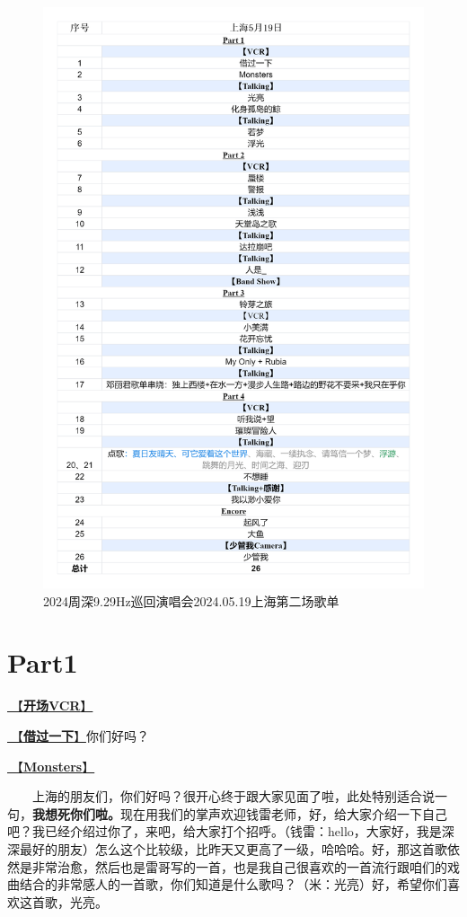 \documentclass[]{ctexbook}
\begin{document}
\begin{figure}

{\centering \includegraphics[width=320pt]{img/playlists/playlists-shanghai-20240519} 

}

\caption{2024周深9.29Hz巡回演唱会2024.05.19上海第二场歌单}\label{fig:unnamed-chunk-36}
\end{figure}

\newpage

\section{Part1}\label{shanghai-20240519-part1}

\hyperref[opening-vcr]{🎥【\textbf{开场VCR}】}

\hyperref[I-will-go-my-way]{🎵【\textbf{借过一下}】}你们好吗？

\hyperref[Monsters]{🎵【\textbf{Monsters}】}

  上海的朋友们，你们好吗？很开心终于跟大家见面了啦，此处特别适合说一句，\textbf{我想死你们啦。}现在用我们的掌声欢迎钱雷老师，好，给大家介绍一下自己吧？我已经介绍过你了，来吧，给大家打个招呼。（钱雷：hello，大家好，我是深深最好的朋友）怎么这个比较级，比昨天又更高了一级，哈哈哈。好，那这首歌依然是非常治愈，然后也是雷哥写的一首，也是我自己很喜欢的一首流行跟咱们的戏曲结合的非常感人的一首歌，你们知道是什么歌吗？（米：光亮）好，希望你们喜欢这首歌，光亮。
\end{document}
